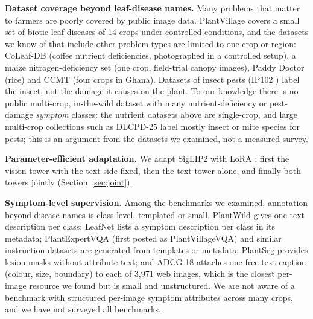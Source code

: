 \documentclass[11pt]{article}
\begin{document}
\textbf{Dataset coverage beyond leaf-disease names.} Many problems that matter to farmers are poorly covered by public image data. PlantVillage \cite{mohanty2016,hughes2015} covers a small set of biotic leaf diseases of 14 crops under controlled conditions, and the datasets we know of that include other problem types are limited to one crop or region: CoLeaf-DB \cite{coleaf} (coffee nutrient deficiencies, photographed in a controlled setup), a maize nitrogen-deficiency set \cite{maizen} (one crop, field-trial canopy images), Paddy Doctor \cite{paddydoctor} (rice) and CCMT \cite{ccmt} (four crops in Ghana). Datasets of insect pests (IP102 \cite{ip102}) label the insect, not the damage it causes on the plant. To our knowledge there is no public multi-crop, in-the-wild dataset with many nutrient-deficiency or pest-damage \emph{symptom} classes: the nutrient datasets above are single-crop, and large multi-crop collections such as DLCPD-25 \cite{dlcpd} label mostly insect or mite species for pests; this is an argument from the datasets we examined, not a measured survey.

\textbf{Parameter-efficient adaptation.} We adapt SigLIP2 with LoRA \cite{lora}: first the vision tower with the text side fixed, then the text tower alone, and finally both towers jointly (Section~\ref{sec:joint}).

\textbf{Symptom-level supervision.} Among the benchmarks we examined, annotation beyond disease names is class-level, templated or small. PlantWild \cite{mvpdr} gives one text description per class; LeafNet \cite{leafnet} lists a symptom description per class in its metadata; PlantExpertVQA (first posted as PlantVillageVQA) \cite{pvvqa} and similar instruction datasets are generated from templates or metadata; PlantSeg \cite{plantseg} provides lesion masks without attribute text; and ADCG-18 \cite{zeng2024} attaches one free-text caption (colour, size, boundary) to each of 3{,}971 web images, which is the closest per-image resource we found but is small and unstructured. We are not aware of a benchmark with structured per-image symptom attributes across many crops, and we have not surveyed all benchmarks.
\end{document}

